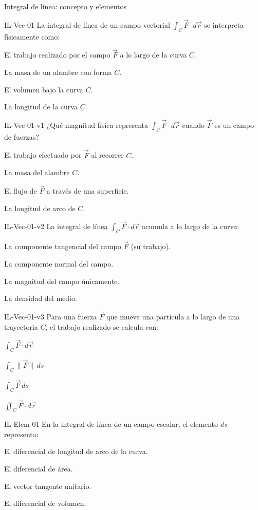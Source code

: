 \documentclass[a4,11pt]{aleph-notas}
\begin{document}
\begin{quiz}{Integral de línea: concepto y elementos}
\begin{multi}[]%
    {IL-Vec-01}
    La integral de línea de un campo vectorial $\displaystyle\int_C \vec{F}\cdot d\vec{r}$ se interpreta físicamente como:
    \item* El trabajo realizado por el campo $\vec{F}$ a lo largo de la curva $C$.
    \item La masa de un alambre con forma $C$.
    \item El volumen bajo la curva $C$.
    \item La longitud de la curva $C$.
\end{multi}

\begin{multi}[]%
    {IL-Vec-01-v1}
    ¿Qué magnitud física representa $\displaystyle\int_C \vec{F}\cdot d\vec{r}$ cuando $\vec{F}$ es un campo de fuerzas?
    \item* El trabajo efectuado por $\vec{F}$ al recorrer $C$.
    \item La masa del alambre $C$.
    \item El flujo de $\vec{F}$ a través de una superficie.
    \item La longitud de arco de $C$.
\end{multi}

\begin{multi}[]%
    {IL-Vec-01-v2}
    La integral de línea $\displaystyle\int_C \vec{F}\cdot d\vec{r}$ acumula a lo largo de la curva:
    \item* La componente tangencial del campo $\vec{F}$ (su trabajo).
    \item La componente normal del campo.
    \item La magnitud del campo únicamente.
    \item La densidad del medio.
\end{multi}

\begin{multi}[]%
    {IL-Vec-01-v3}
    Para una fuerza $\vec{F}$ que mueve una partícula a lo largo de una trayectoria $C$, el trabajo realizado se calcula con:
    \item* $\displaystyle\int_C \vec{F}\cdot d\vec{r}$
    \item $\displaystyle\int_C \|\vec{F}\|\,ds$
    \item $\displaystyle\int_C \vec{F}\,ds$
    \item $\displaystyle\iint_C \vec{F}\cdot d\vec{r}$
\end{multi}

\begin{multi}[]%
    {IL-Elem-01}
    En la integral de línea de un campo escalar, el elemento $ds$ representa:
    \item* El diferencial de longitud de arco de la curva.
    \item El diferencial de área.
    \item El vector tangente unitario.
    \item El diferencial de volumen.
\end{multi}


\end{quiz}
\end{document}
